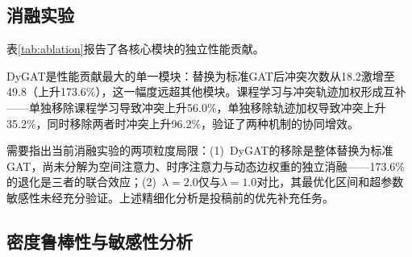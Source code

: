 \documentclass[12pt,a4paper,UTF8]{ctexart}
\begin{document}
\subsection{消融实验}

表\ref{tab:ablation}报告了各核心模块的独立性能贡献。

\begin{table}[H]
    \centering
    \caption{消融实验结果（21架eVTOL，5次独立测试）}
    \label{tab:ablation}
\end{table}

DyGAT是性能贡献最大的单一模块：替换为标准GAT后冲突次数从18.2激增至49.8（上升173.6\%），这一幅度远超其他模块。课程学习与冲突轨迹加权形成互补——单独移除课程学习导致冲突上升56.0\%，单独移除轨迹加权导致冲突上升35.2\%，同时移除两者时冲突上升96.2\%，验证了两种机制的协同增效。

需要指出当前消融实验的两项粒度局限：(1)~DyGAT的移除是整体替换为标准GAT，尚未分解为空间注意力、时序注意力与动态边权重的独立消融——173.6\%的退化是三者的联合效应；(2)~$\lambda=2.0$仅与$\lambda=1.0$对比，其最优化区间和超参数敏感性未经充分验证。上述精细化分析是投稿前的优先补充任务。

\subsection{密度鲁棒性与敏感性分析}
\end{document}
